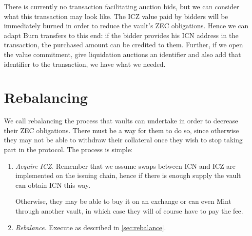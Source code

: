 There is currently no transaction facilitating auction bids, but we can consider what this transaction may look like.
The ICZ value paid by bidders will be immediately burned in order to reduce the vault's ZEC obligations.
Hence we can adapt Burn transfers to this end: if the bidder provides his ICN address in the transaction, the purchased amount can be credited to them.
Further, if we open the value commitment, give liquidation auctions an identifier and also add that identifier to the transaction, we have what we needed.


\section{Rebalancing}
\label{sec:rebalancing_exit}

We call rebalancing the process that vaults can undertake in order to decrease their ZEC obligations.
There must be a way for them to do so, since otherwise they may not be able to withdraw their collateral once they wish to stop taking part in the protocol.
The process is simple:
\begin{enumerate}
    \item \emph{Acquire ICZ}. Remember that we assume swaps between ICN and ICZ are implemented on the issuing chain, hence if there is enough supply the vault can obtain ICN this way.
    
    Otherwise, they may be able to buy it on an exchange or can even Mint through another vault, in which case they will of course have to pay the fee.
    
    \item \emph{Rebalance.} Execute \rebalanceop as described in \cref{sec:rebalance}.
\end{enumerate}




